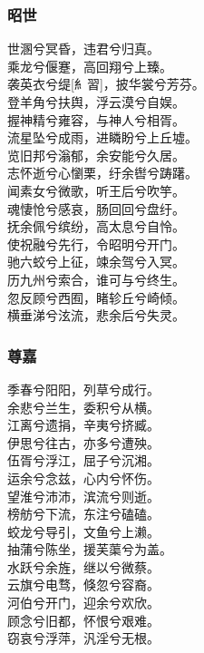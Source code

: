\documentclass[]{article}
\begin{document}
\hypertarget{header-n3048}{%
\subsubsection{昭世}\label{header-n3048}}

世溷兮冥昏，违君兮归真。\\
乘龙兮偃蹇，高回翔兮上臻。\\
袭英衣兮缇{[}糹習{]}，披华裳兮芳芬。\\
登羊角兮扶舆，浮云漠兮自娱。\\
握神精兮雍容，与神人兮相胥。\\
流星坠兮成雨，进瞵盼兮上丘墟。\\
览旧邦兮滃郁，余安能兮久居。\\
志怀逝兮心懰栗，纡余辔兮踌躇。\\
闻素女兮微歌，听王后兮吹竽。\\
魂悽怆兮感哀，肠回回兮盘纡。\\
抚余佩兮缤纷，高太息兮自怜。\\
使祝融兮先行，令昭明兮开门。\\
驰六蛟兮上征，竦余驾兮入冥。\\
历九州兮索合，谁可与兮终生。\\
忽反顾兮西囿，睹轸丘兮崎倾。\\
横垂涕兮泫流，悲余后兮失灵。

\hypertarget{header-n3053}{%
\subsubsection{尊嘉}\label{header-n3053}}

季春兮阳阳，列草兮成行。\\
余悲兮兰生，委积兮从横。\\
江离兮遗捐，辛夷兮挤臧。\\
伊思兮往古，亦多兮遭殃。\\
伍胥兮浮江，屈子兮沉湘。\\
运余兮念兹，心内兮怀伤。\\
望淮兮沛沛，滨流兮则逝。\\
榜舫兮下流，东注兮磕磕。\\
蛟龙兮导引，文鱼兮上濑。\\
抽蒲兮陈坐，援芙蕖兮为盖。\\
水跃兮余旌，继以兮微蔡。\\
云旗兮电骛，倏忽兮容裔。\\
河伯兮开门，迎余兮欢欣。\\
顾念兮旧都，怀恨兮艰难。\\
窃哀兮浮萍，汎淫兮无根。
\end{document}
